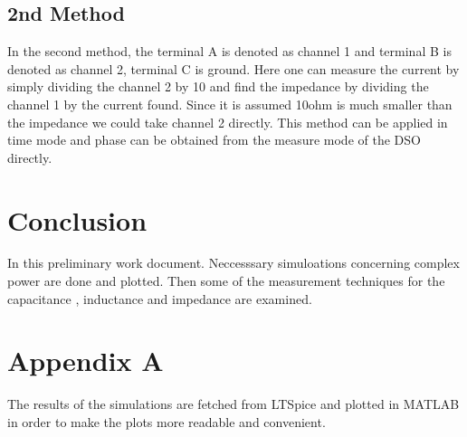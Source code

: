 \documentclass[letterpaper,12pt]{article}
\begin{document}
\subsection{2nd Method}
In the second method, the terminal A is denoted as channel 1 and terminal B is denoted as channel 2, terminal C is ground. Here one can measure the current by simply dividing the channel 2 by 10 and find the impedance by dividing the channel 1 by the current found. Since it is assumed 10ohm is much smaller than the impedance we could take channel 2 directly. This method can be applied in time mode and phase can be obtained from the measure mode of the DSO directly.

\section{Conclusion}
In this preliminary work document. Neccesssary simuloations concerning complex power are done and plotted. Then some of the measurement techniques for the capacitance , inductance and impedance are examined.

\section*{Appendix A}
The results of the simulations are fetched from LTSpice and plotted in MATLAB in order to make the plots more readable and convenient.
\end{document}
